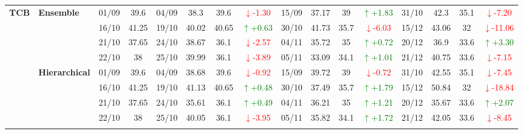 {\begin{longtable}{llcc|cccc|cccc|cccc}
\multirow{12}{*}{\textbf{TCB}} 
& \textbf{Ensemble}
& 01/09 & 39.6 & 04/09 & 38.3 & 39.6 & \textcolor{red}{\(\downarrow\)-1.30} & 15/09 & 37.17 & 39 & \textcolor{green}{\(\uparrow\)+1.83} & 31/10 & 42.3 & 35.1 & \textcolor{red}{\(\downarrow\)-7.20} \\

&
& 16/10 & 41.25 & 19/10 & 40.02 & 40.65 & \textcolor{green}{\(\uparrow\)+0.63} & 30/10 & 41.73 & 35.7 & \textcolor{red}{\(\downarrow\)-6.03} & 15/12 & 43.06 & 32 & \textcolor{red}{\(\downarrow\)-11.06} \\

&
& 21/10 & 37.65 & 24/10 & 38.67 & 36.1 & \textcolor{red}{\(\downarrow\)-2.57} & 04/11 & 35.72 & 35 & \textcolor{green}{\(\uparrow\)+0.72} & 20/12 & 36.9 & 33.6 & \textcolor{green}{\(\uparrow\)+3.30} \\

&
& 22/10 & 38 & 25/10 & 39.99 & 36.1 & \textcolor{red}{\(\downarrow\)-3.89} & 05/11 & 33.09 & 34.1 & \textcolor{green}{\(\uparrow\)+1.01} & 21/12 & 40.75 & 33.6 & \textcolor{red}{\(\downarrow\)-7.15} \\
\cmidrule(lr){2-16}


& \textbf{Hierarchical}
& 01/09 & 39.6 & 04/09 & 38.68 & 39.6 & \textcolor{red}{\(\downarrow\)-0.92} & 15/09 & 39.72 & 39 & \textcolor{red}{\(\downarrow\)-0.72} & 31/10 & 42.55 & 35.1 & \textcolor{red}{\(\downarrow\)-7.45} \\

&
& 16/10 & 41.25 & 19/10 & 41.13 & 40.65 & \textcolor{green}{\(\uparrow\)+0.48} & 30/10 & 37.49 & 35.7 & \textcolor{green}{\(\uparrow\)+1.79} & 15/12 & 50.84 & 32 & \textcolor{red}{\(\downarrow\)-18.84} \\

&
& 21/10 & 37.65 & 24/10 & 35.61 & 36.1 & \textcolor{green}{\(\uparrow\)+0.49} & 04/11 & 36.21 & 35 & \textcolor{green}{\(\uparrow\)+1.21} & 20/12 & 35.67 & 33.6 & \textcolor{green}{\(\uparrow\)+2.07} \\

&
& 22/10 & 38 & 25/10 & 40.05 & 36.1 & \textcolor{red}{\(\downarrow\)-3.95} & 05/11 & 35.82 & 34.1 & \textcolor{green}{\(\uparrow\)+1.72} & 21/12 & 42.05 & 33.6 & \textcolor{red}{\(\downarrow\)-8.45} \\
\cmidrule(lr){2-16}




\end{longtable}}
